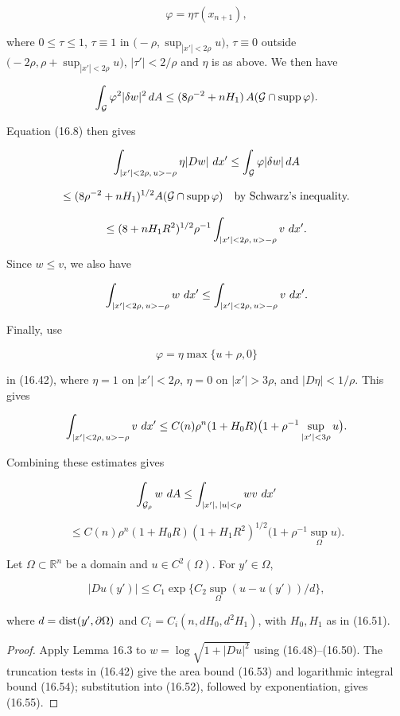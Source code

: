 \[
\varphi=\eta\tau(x_{n+1}),
\]

where $0\le \tau\le 1$, $\tau\equiv 1$ in $\bigl(-\rho,\sup_{|x'|<2\rho}u\bigr)$, $\tau\equiv 0$ outside $\bigl(-2\rho,\rho+\sup_{|x'|<2\rho}u\bigr)$, $|\tau'|<2/\rho$
and $\eta$ is as above. We then have

\[
\int_{\mathcal{G}} \varphi^2|\delta w|^2\,dA \le (8\rho^{-2}+nH_1)\,A(\mathcal{G}\cap\operatorname{supp}\varphi).
\]

Equation (16.8) then gives

\[
\int_{|x'|<2\rho,\,u>-\rho}\eta|Dw|\,\,dx'
\le \int_{\mathcal{G}} \varphi|\delta w|\,dA
\]

\[
\le (8\rho^{-2}+nH_1)^{1/2}A(\mathcal{G}\cap\operatorname{supp}\varphi)
\quad\text{by Schwarz's inequality.}
\]

\[
\le (8+nH_1R^2)^{1/2}\rho^{-1}
\int_{|x'|<2\rho,\,u>-\rho} v\,\,dx'.
\]

Since $w\le v$, we also have

\[
\int_{|x'|<2\rho,\,u>-\rho} w\,\,dx' \le \int_{|x'|<2\rho,\,u>-\rho} v\,\,dx'.
\]

Finally, use

\[
\varphi=\eta\max\{u+\rho,0\}
\]







in (16.42), where $\eta=1$ on $|x'|<2\rho$, $\eta=0$ on
$|x'|>3\rho$, and $|D\eta|<1/\rho$. This gives

\[
\int_{|x'|<2\rho,\,u>-\rho} v\,\,dx' \le C(n)\rho^n(1+H_0R)\bigl(1+\rho^{-1}\sup_{|x'|<3\rho}u\bigr).
\]

Combining these estimates gives

\[
\int_{\mathcal{G}_\rho} w\,\,dA \le \int_{|x'|,\,|u|<\rho} wv\,\,dx'
\]

\begin{equation}\tag{16.54}
\le C(n)\rho^n(1+H_0R)(1+H_1R^2)^{1/2}\bigl(1+\rho^{-1}\sup_{\Omega}u\bigr).
\end{equation}

\begin{theorem}\label{gilbarg-trudinger.thm.16.5.interior-gradient-bound}
Let $\Omega\subset\mathbb R^n$ be a domain and $u\in C^2(\Omega)$. For $y'\in\Omega$,

\begin{equation}\tag{16.55}
|Du(y')|\le C_1 \exp\{C_2 \sup_{\Omega}(u-u(y'))/d\},
\end{equation}

where $d=\operatorname{dist}(y',\partial\Omega)$ and $C_i=C_i(n,dH_0,d^2H_1)$, with $H_0,H_1$ as in (16.51).
\end{theorem}
\begin{proof}
\sketch Apply Lemma 16.3 to $w=\log\sqrt{1+|Du|^2}$ using (16.48)--(16.50). The truncation tests in (16.42) give the area bound (16.53) and logarithmic integral bound (16.54); substitution into (16.52), followed by exponentiation, gives (16.55).
\end{proof}

